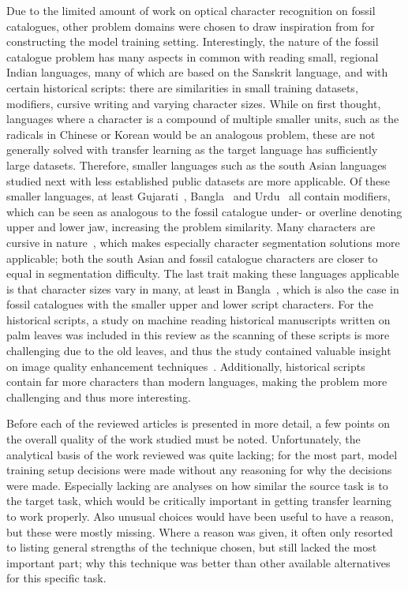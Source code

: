\documentclass[english,twoside,openright]{UH_DS_MSc}
\begin{document}
Due to the limited amount of work on optical character recognition on fossil catalogues, other 
problem domains were chosen to draw inspiration from for constructing the model training setting. 
Interestingly, the nature of the fossil catalogue problem has many aspects in common with reading small, 
regional Indian languages, many of which are based on the Sanskrit language, and with certain historical 
scripts: there are similarities in small training datasets, modifiers, cursive writing and varying character sizes.
While on first thought, languages where a character is a compound of multiple smaller units, such as the 
radicals in Chinese or Korean would be an analogous problem, these are not generally solved with transfer learning 
as the target language has sufficiently large datasets. Therefore, smaller languages such as the south Asian languages studied next with less established public datasets 
are more applicable.
Of these smaller languages, at least
Gujarati~\cite{2limbachiyaGujarati}, Bangla~\cite{3chatterjeeBengali} and Urdu~\cite{5rasheedHandwrittenUrduWAlexNet} all contain modifiers,
which can be seen as analogous to the fossil catalogue under- or overline denoting upper and lower jaw, increasing the problem similarity.
Many characters are cursive in nature~\cite{5rasheedHandwrittenUrduWAlexNet}, which makes especially character segmentation 
solutions more applicable; both the south Asian and fossil catalogue characters are closer to equal in segmentation difficulty.
The last trait making these languages applicable is that character sizes vary in many, at least in Bangla~\cite{6shoponBangla}, which 
is also the case in fossil catalogues with the smaller upper and lower script characters.
For the historical scripts, a study on machine reading historical manuscripts written on palm leaves was 
included in this review as the scanning of these scripts is more challenging due to the old leaves, and thus the 
study contained valuable insight on image quality enhancement techniques~\cite{9thuonPalm}. Additionally, historical scripts 
contain far more characters than modern languages, making the problem more challenging and thus more interesting.


Before each of the reviewed articles is presented in more detail, a few points on the overall quality of the work studied must be noted.
 Unfortunately, the analytical basis of the work reviewed was quite lacking; for the most part, model training setup decisions were made 
 without any reasoning for why the decisions were made. Especially lacking are analyses on how similar the source task 
 is to the target task, which would be critically important in getting transfer learning to work properly. 
 Also unusual choices would have been useful to have a reason, but these were mostly missing. 
 Where a reason was given, it often only resorted to listing general strengths of the technique chosen,
  but still lacked the most important part; why this technique was better than other available alternatives for this specific task.
\end{document}
